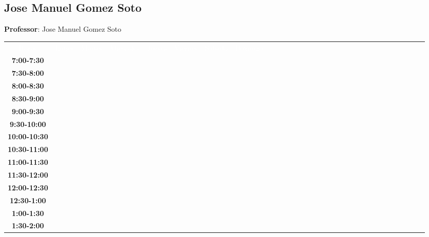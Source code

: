 \documentclass{article}
\begin{document}
\newpage


\subsection{Jose Manuel Gomez Soto}
\vspace*{.1cm}

\begin{flushright}
{\LARGE \textbf{Professor}: Jose Manuel Gomez Soto}
\end{flushright}
\vspace{1cm}

\begin{table}[ht]\centering\small\begin{tabular}{|c|c|c|c|c|c|c|c|c|c|c|c|c|c|c|c|c|c|c|c|c|c|c|c|c|c|c|c|c|c|}\hline\cellcolor{black}\textcolor{white}{Horas} & \cellcolor{black}\textcolor{white}{ Lunes  } & \cellcolor{black}\textcolor{white}{ Martes } & \cellcolor{black}\textcolor{white}{Miercoles} & \cellcolor{black}\textcolor{white}{ Jueves } & \cellcolor{black}\textcolor{white}{ Viernes } & \cellcolor{black}\textcolor{white}{ Sabado } & \cellcolor{black}\textcolor{white}{ Domingo } \\
\cline{1-8} 
\textbf{7:00-7:30 } &   &   &   &   &   &   &   \\
\cline{1-8} 
\textbf{7:30-8:00} &   &   &   &   &   &   &   \\
\cline{1-8} 
\textbf{8:00-8:30} &   &   &   &   &   &   &   \\
\cline{1-8} 
\textbf{8:30-9:00} &   &   &   &   &   &   &   \\
\cline{1-8} 
\textbf{9:00-9:30} &   &   &   &   &   &   &   \\
\cline{1-8} 
\textbf{9:30-10:00} &   &   &   &   &   &   &   \\
\cline{1-8} 
\textbf{10:00-10:30} &   &   &   &   &   &   &   \\
\cline{1-8} 
\textbf{10:30-11:00} &   &   &   &   &   &   &   \\
\cline{1-8} 
\textbf{11:00-11:30} &   &   &   &   &   &   &   \\
\cline{1-8} 
\textbf{11:30-12:00} &   &   &   &   &   &   &   \\
\cline{1-8} 
\textbf{12:00-12:30} &   &   &   &   &   &   &   \\
\cline{1-8} 
\textbf{12:30-1:00} &   &   &   &   &   &   &   \\
\cline{1-8} 
\textbf{1:00-1:30} &   &   &   &   &   &   &   \\
\cline{1-8} 
\textbf{1:30-2:00} &   &   &   &   &   &   &   \\

\end{tabular}
\end{table}
\end{document}
